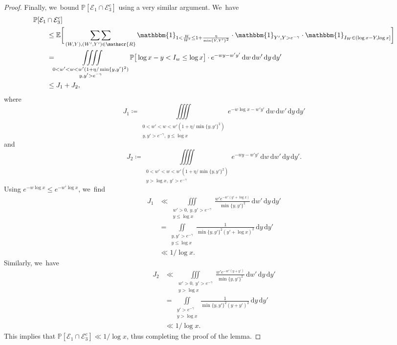 \documentclass[10pt,a4paper]{article}
\newcommand{\PP}{\mathbb{P}}
\newcommand{\EE}{\mathbb{E}}
\newcommand{\dee}{\,\mathrm{d}}
\newcommand{\one}{\mathbbm{1}}
\newcommand{\EC}{\mathcal{E}}
\newcommand{\RS}{\mathscr{R}}
\newcommand{\bg}{\big}
\newcommand{\bggg}{\bigg}
\theoremstyle{plain}
\theoremstyle{definition}
\begin{document}
\begin{proof}
Finally, we~bound $\PP[\EC_1 \cap \EC_3^c]$ using a very similar argument. We~have
\[
\begin{split}
&\PP[\EC_1 \cap \EC_3^c] \\
&\qquad \le
\EE\bggg[ \mathop{\sum\sum}_{(W,Y),(W',Y') \in\RS} \one_{1<\frac{W}{W'}\le 1+\frac{\eta}{\min\{Y,Y'\}^2}}\cdot\one_{Y',Y>e^{-\gamma}} \cdot \one_{I_W\in(\log x-Y,\log x]} \bggg] \\
&\qquad =
\iiiint\limits_{\substack{0 < w'<w < w'(1+\eta/\min\{y,y'\}^2)\\ y, y' > e^{-\gamma}}} \PP\bg[\log x - y<I_w \le \log x\bg]\cdot e^{-wy-w'y'}
\dee w\dee w'\dee y\dee y' \\
&\qquad \le J_1+J_2,
\end{split}
\]
where
\[
J_1 \coloneqq \iiiint\limits_{\substack{0 < w'<w < w'(1+\eta/\min\{y,y'\}^2)\\ y, y' > e^{-\gamma},\ y\le \log x}} e^{-w\log x-w'y'}
\dee w\dee w'\dee y\dee y'
\]
and
\[
J_2 \coloneqq \iiiint\limits_{\substack{0 < w'<w < w'(1+\eta/\min\{y,y'\}^2)\\ y>\log x,\ y' > e^{-\gamma}}} e^{-wy-w'y'}
\dee w\dee w'\dee y\dee y'.
\]
Using $e^{-w\log x}\le e^{-w'\log x}$, we~find
\begin{align*}
J_1&\ll \iiint\limits_{\substack{w'>0,\ y, y' > e^{-\gamma}\\ y\le \log x}} \frac{w'e^{-w'(y'+\log x)}}{\min\{y,y'\}^2} \dee w'\dee y\dee y' \\
&= \iint\limits_{\substack{y, y' > e^{-\gamma} \\ y\le \log x}} \frac{1}{\min\{y,y'\}^2(y'+\log x)^2} \dee y\dee y'\\
& \ll1/\log x.
\end{align*}
Similarly, we~have
\begin{align*}
J_2&\ll \iiint\limits_{\substack{w'>0,\ y' > e^{-\gamma}\\ y>\log x}} \frac{w'e^{-w'(y+y')} }{\min\{y,y'\}^2} \dee w'\dee y\dee y' \\
&= \iint\limits_{\substack{y' > e^{-\gamma} \\ y>\log x}} \frac{1}{\min\{y,y'\}^2(y+y')^2} \dee y\dee y'\\
& \ll1/\log x.
\end{align*}
This implies that $\PP[\EC_1\cap\EC_3^c]\ll 1/\log x$, thus completing the proof of the lemma.
\end{proof}
\end{document}
